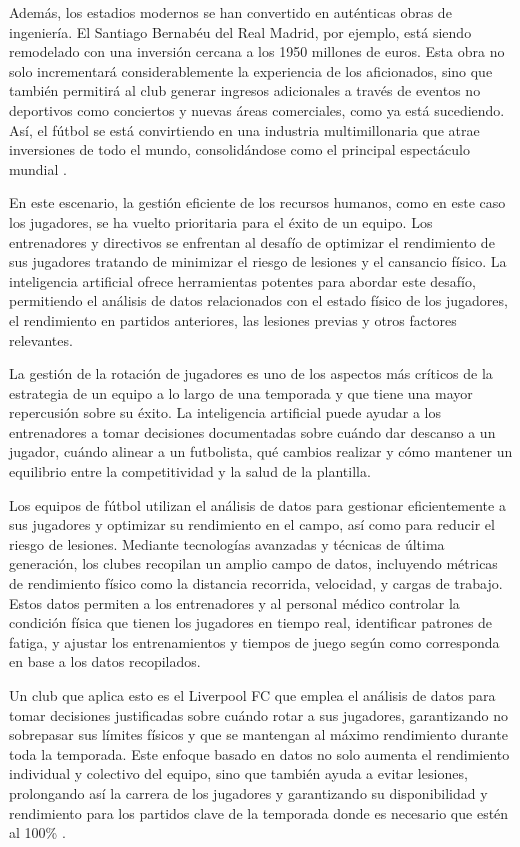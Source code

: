 Además, los estadios modernos se han convertido en auténticas obras de ingeniería. El Santiago Bernabéu del Real Madrid, por ejemplo, está siendo remodelado con una inversión cercana a los 1950 millones de euros. Esta obra no solo incrementará considerablemente la experiencia de los aficionados, sino que también permitirá al club generar ingresos adicionales a través de eventos no deportivos como conciertos y nuevas áreas comerciales, como ya está sucediendo. Así, el fútbol se está convirtiendo en una industria multimillonaria que atrae inversiones de todo el mundo, consolidándose como el principal espectáculo mundial \cite{bernabeu}.

En este escenario, la gestión eficiente de los recursos humanos, como en este caso los jugadores, se ha vuelto prioritaria para el éxito de un equipo. Los entrenadores y directivos se enfrentan al desafío de optimizar el rendimiento de sus jugadores tratando de minimizar el riesgo de lesiones y el cansancio físico. La inteligencia artificial ofrece herramientas potentes para abordar este desafío, permitiendo el análisis de datos relacionados con el estado físico de los jugadores, el rendimiento en partidos anteriores, las lesiones previas y otros factores relevantes.

La gestión de la rotación de jugadores es uno de los aspectos más críticos de la estrategia de un equipo a lo largo de una temporada y que tiene una mayor repercusión sobre su éxito. La inteligencia artificial puede ayudar a los entrenadores a tomar decisiones documentadas sobre cuándo dar descanso a un jugador, cuándo alinear a un futbolista, qué cambios realizar y cómo mantener un equilibrio entre la competitividad y la salud de la plantilla. 

Los equipos de fútbol utilizan el análisis de datos para gestionar eficientemente a sus jugadores y optimizar su rendimiento en el campo, así como para reducir el riesgo de lesiones. Mediante tecnologías avanzadas y técnicas de última generación, los clubes recopilan un amplio campo de datos, incluyendo métricas de rendimiento físico como la distancia recorrida, velocidad, y cargas de trabajo. Estos datos permiten a los entrenadores y al personal médico controlar la condición física que tienen los jugadores en tiempo real, identificar patrones de fatiga, y ajustar los entrenamientos y tiempos de juego según como corresponda en base a los datos recopilados. 

Un club que aplica esto es el Liverpool FC que emplea el análisis de datos para tomar decisiones justificadas sobre cuándo rotar a sus jugadores, garantizando no sobrepasar sus límites físicos y que se mantengan al máximo rendimiento durante toda la temporada. Este enfoque basado en datos no solo aumenta el rendimiento individual y colectivo del equipo, sino que también ayuda a evitar lesiones, prolongando así la carrera de los jugadores y garantizando su disponibilidad y rendimiento para los partidos clave de la temporada donde es necesario que estén al 100\% \cite{liverpool}.

